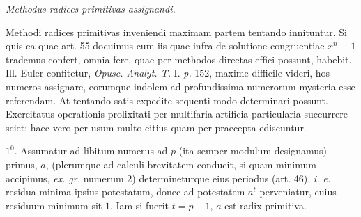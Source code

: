 \begin{center}\emph{Methodus radices primitivas assignandi.}\end{center}


Methodi radices primitivas inveniendi maximam partem tentando innituntur. Si quis ea quae art. 55 docuimus cum iis quae infra de solutione congruentiae $x^n\equiv1$ trademus confert, omnia fere, quae per methodos directas effici possunt, habebit. Ill. Euler confitetur, \emph{Opusc. Analyt. T.} I. \emph{p.} 152, maxime difficile videri, hos numeros assignare, eorumque indolem ad profundissima numerorum mysteria esse referendam. At tentando satis expedite sequenti modo determinari possunt. Exercitatus operationis prolixitati per multifaria artificia particularia succurrere sciet: haec vero per usum multo citius quam per praecepta ediscuntur.

$1^0$. Assumatur ad libitum numerus ad $p$ (ita semper modulum designamus) primus, $a$, (plerumque ad calculi brevitatem conducit, si quam minimum accipimus, \emph{ex. gr.} numerum $2$) determineturque eius periodus (art. 46), \emph{i. e.} residua minima ipsius potestatum, donec ad potestatem $a^t$ perveniatur, cuius residuum minimum sit $1$. Iam si fuerit $t=p-1$, $a$ est radix primitiva.

